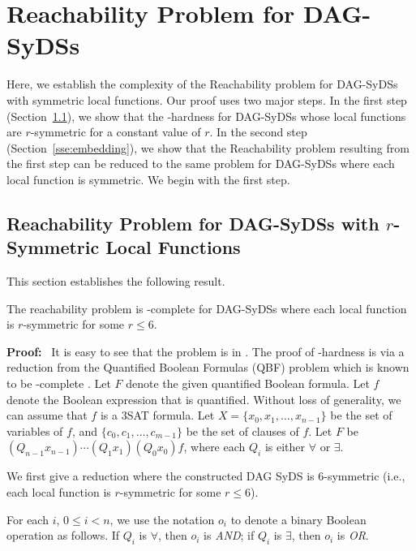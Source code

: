 \section{Reachability Problem for DAG-SyDSs}
\label{sec:reachability}

Here, we establish the complexity
of the Reachability problem for
DAG-SyDSs with symmetric local functions. 
Our proof uses two major steps.
In the first step (Section~\ref{sse:hardness_six_sym}),
we show that the \cpsp-hardness for DAG-SyDSs whose local
functions are $r$-symmetric for a constant value of $r$.
In the second step (Section~\ref{sse:embedding}), we show
that the Reachability problem resulting from the first step
can be reduced to the same problem for DAG-SyDSs where each
local function is symmetric.
We begin with the first step.

\subsection{Reachability Problem for DAG-SyDSs with $r$-Symmetric
Local Functions}
\label{sse:hardness_six_sym}

This section establishes the following result.

\begin{theorem}\label{thm:reach-six-sym}
The reachability problem is \cpsp-complete for DAG-SyDSs
where each local function is $r$-symmetric for some $r \leq 6$.
\end{theorem}

\noindent
\textbf{Proof:}~ It is easy to see that the problem is in \cpsp. 
The proof of \cpsp-hardness is via a reduction from 
the Quantified Boolean Formulas (QBF) problem
which is known to be \cpsp-complete \cite{GJ-1979}.
Let $F$ denote the given quantified Boolean formula.
Let $f$ denote the Boolean expression that is quantified.
Without loss of generality, we can assume that $f$ is a 3SAT formula.
Let $X = \{x_0, x_1, \dots , x_{n-1}\}$ be the set of variables of $f$,
and $\{c_0, c_1, \dots , c_{m-1}\}$ be the set of clauses of $f$.
Let $F$ be $(Q_ {n-1} x_{n-1}) \cdots (Q_1 x_1) (Q_0 x_0) f$,
where each $Q_i$ is either $\forall$ or $\exists$.       

We first give a reduction where the constructed DAG SyDS is 6-symmetric
(i.e., each local function is $r$-symmetric for some $r \leq 6$).

For each $i$, $0 \leq i <n$,
 we use the notation $o_i$ to denote a binary Boolean operation as follows.
 If $Q_i$ is $\forall$, then $o_i$ is {\em AND};
 if $Q_i$ is $\exists$, then $o_i$ is {\em OR}.

